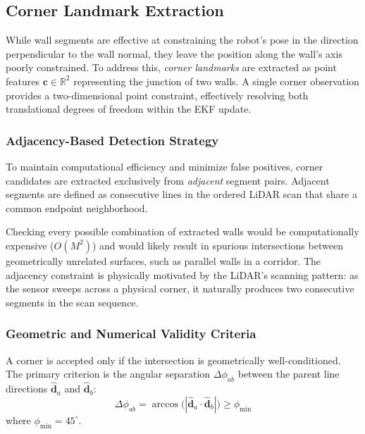 \documentclass[11pt]{article}
\begin{document}
\subsection{Corner Landmark Extraction}

While wall segments are effective at constraining the robot's pose in the direction perpendicular to the wall normal, they leave the position along the wall's axis poorly constrained. To address this, \textit{corner landmarks} are extracted as point features $\mathbf{c} \in \mathbb{R}^2$ representing the junction of two walls. A single corner observation provides a two-dimensional point constraint, effectively resolving both translational degrees of freedom within the EKF update.

\subsubsection{Adjacency-Based Detection Strategy}
To maintain computational efficiency and minimize false positives, corner candidates are extracted exclusively from \textit{adjacent} segment pairs. Adjacent segments are defined as consecutive lines in the ordered LiDAR scan that share a common endpoint neighborhood. 

Checking every possible combination of extracted walls would be computationally expensive ($O(M^2)$) and would likely result in spurious intersections between geometrically unrelated surfaces, such as parallel walls in a corridor. The adjacency constraint is physically motivated by the LiDAR’s scanning pattern: as the sensor sweeps across a physical corner, it naturally produces two consecutive segments in the scan sequence.



\subsubsection{Geometric and Numerical Validity Criteria}
A corner is accepted only if the intersection is geometrically well-conditioned. The primary criterion is the angular separation $\Delta\phi_{ab}$ between the parent line directions $\hat{\mathbf{d}}_a$ and $\hat{\mathbf{d}}_b$:
\begin{equation}
	\Delta\phi_{ab} = \arccos\bigl(|\hat{\mathbf{d}}_a \cdot \hat{\mathbf{d}}_b|\bigr) \geq \phi_{\min}
\end{equation}
where $\phi_{\min} = 45^{\circ}$.
\end{document}
